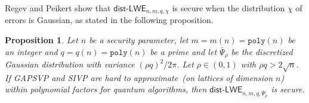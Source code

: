 \documentclass[11pt]{article}
\newcommand{\secref}[1]{\mbox{Section~\ref{#1}}}
\newcommand{\defref}[1]{\mbox{Definition~\ref{#1}}}
\newcommand{\class}[1]{{\ensuremath{\mathsf{#1}}}}
\newcommand{\vect}[1]{\ensuremath{\textbf{#1}}}
\newcommand{\unp}{\ensuremath{\mathtt{unp}}\xspace}
\newcommand{\poly}{\ensuremath{\mathtt{poly}}\xspace}
\newcommand{\lwe}{\class{LWE}}
\newcommand{\distLWE}{\ensuremath{\class{dist\mbox{-}LWE}}}
\newtheorem{proposition}[theorem]{Proposition}
\newcommand{\vA}{\vect{A}}
\newcommand{\vx}{\vect{x}}
\begin{document}
 Regev\cite{regev2005LWE} and Peikert \cite{peikert2009latticereduction} show that $\class{dist}$-$\lwe_{n, m, q, \chi}$ is secure when the distribution $\chi$ of errors is Gaussian, as stated in the following proposition.



\begin{proposition} 
\label{assume:entropy LWE}
Let $n$ be a security parameter, let $m = m(n) = \poly(n)$ be an integer and $q = q(n) = \poly(n)$ be a prime and let $\bar{\Psi}_\rho$ be the discretized Gaussian distribution with variance $(\rho q)^2/2\pi$.  Let $\rho \in (0,1)$ with $\rho q > 2\sqrt{n}$.  If GAPSVP and SIVP are hard to approximate~(on lattices of dimension $n$) within polynomial factors for quantum algorithms, then $\distLWE_{n, m, q, \bar{\Psi}_\rho}$ is secure. 

\end{proposition}
\end{document}
